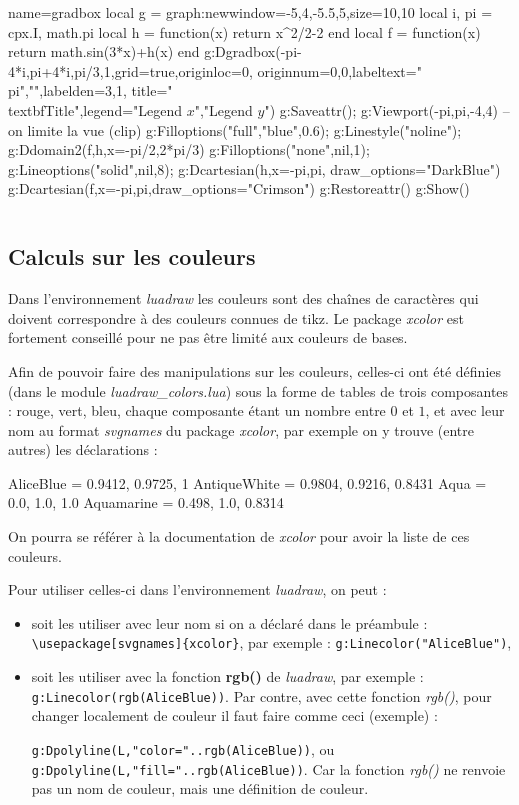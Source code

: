 \documentclass[%
10pt,%
a4paper,%
french,%
]%
{article}%
\newenvironment*{demo}[2][]{%
\gdef\legende{#2}%
\gdef\lab{#1}%
\bgroup
\VerbatimOut{\jobname.tmp}%
}%
{%
\endVerbatimOut%
\egroup%
\inputminted[ignorelexererrors=true,breaklines,bgcolor=Beige,linenos,numbersep=6pt,frame=single,fontsize=\footnotesize]{Lua}{\jobname.tmp}%
\begin{minipage}{0.9\textwidth}
\begin{center}
\captionof{figure}{\legende}\label{\lab}%
%
\end{center}
\end{minipage}
}
\begin{document}
\begin{demo}{Utilisation de Dgradbox}
\begin{luadraw}{name=gradbox}
local g = graph:new{window={-5,4,-5.5,5},size={10,10}}
local i, pi = cpx.I, math.pi
local h = function(x) return x^2/2-2 end
local f = function(x) return math.sin(3*x)+h(x) end
g:Dgradbox({-pi-4*i,pi+4*i,pi/3,1},{grid=true,originloc=0, originnum={0,0},labeltext={"\\pi",""},labelden={3,1}, title="\\textbf{Title}",legend={"Legend $x$","Legend $y$"}})
g:Saveattr(); g:Viewport(-pi,pi,-4,4) -- on limite la vue (clip)
g:Filloptions("full","blue",0.6); g:Linestyle("noline"); g:Ddomain2(f,h,{x={-pi/2,2*pi/3}})
g:Filloptions("none",nil,1); g:Lineoptions("solid",nil,8); g:Dcartesian(h,{x={-pi,pi}, draw_options="DarkBlue"})
g:Dcartesian(f,{x={-pi,pi},draw_options="Crimson"})
g:Restoreattr()
g:Show()
\end{luadraw}
\end{demo}

\subsection{Calculs sur les couleurs}

Dans l'environnement \emph{luadraw} les couleurs sont des chaînes de caractères qui doivent correspondre à des couleurs connues de tikz. Le package \emph{xcolor} est fortement conseillé pour ne pas être limité aux couleurs de bases.

Afin de pouvoir faire des manipulations sur les couleurs, celles-ci ont été définies (dans le module \emph{luadraw\_colors.lua}) sous la forme de tables de trois composantes : rouge, vert, bleu, chaque composante étant un nombre entre $0$ et $1$, et avec leur nom au format \emph{svgnames} du package \emph{xcolor}, par exemple on y trouve (entre autres) les déclarations :
\begin{Luacode}
AliceBlue = {0.9412, 0.9725, 1}
AntiqueWhite = {0.9804, 0.9216, 0.8431}
Aqua = {0.0, 1.0, 1.0}
Aquamarine = {0.498, 1.0, 0.8314}
\end{Luacode}
On pourra se référer à la documentation de \emph{xcolor} pour avoir la liste de ces couleurs.

Pour utiliser celles-ci dans l'environnement \emph{luadraw}, on peut :
\begin{itemize}
    \item soit les utiliser avec leur nom si on a déclaré dans le préambule : \verb|\usepackage[svgnames]{xcolor}|, par exemple : \texttt{g:Linecolor("AliceBlue")},
    \item soit les utiliser avec la fonction \textbf{rgb()} de \emph{luadraw}, par exemple : \texttt{g:Linecolor(rgb(AliceBlue))}. Par contre, avec cette fonction \emph{rgb()}, pour changer localement de couleur il faut faire comme ceci (exemple) : \par
    \texttt{g:Dpolyline(L,"color="..rgb(AliceBlue))}, ou \texttt{g:Dpolyline(L,"fill="..rgb(AliceBlue))}. Car la fonction \emph{rgb()} ne renvoie pas un nom de couleur, mais une définition de couleur.
\end{itemize}
\end{document}
